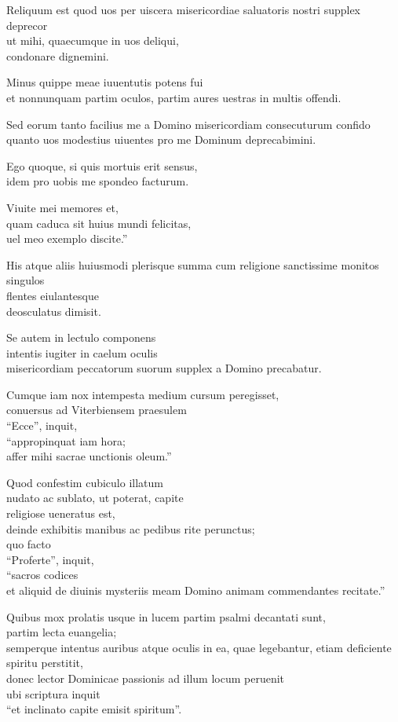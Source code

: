 \documentclass[a5paper,twoside]{article}
\begin{document}
Reliquum est quod uos per uiscera misericordiae saluatoris nostri supplex deprecor \\
ut mihi, quaecumque in uos deliqui, \\
condonare dignemini.  

Minus quippe meae iuuentutis potens fui \\
et nonnunquam partim oculos, partim aures uestras in multis offendi.   

Sed eorum tanto facilius me a Domino misericordiam consecuturum confido \\
quanto uos modestius uiuentes pro me Dominum deprecabimini.  

Ego quoque, si quis mortuis erit sensus, \\
idem pro uobis me spondeo facturum.  

Viuite mei memores et, \\
quam caduca sit huius mundi felicitas, \\
uel meo exemplo discite.''

His atque aliis huiusmodi plerisque summa cum religione sanctissime monitos singulos \\
flentes eiulantesque \\
deosculatus dimisit.  

Se autem in lectulo componens \\
intentis iugiter in caelum oculis \\
misericordiam peccatorum suorum supplex a Domino precabatur. 

Cumque iam nox intempesta medium cursum peregisset, \\
conuersus ad Viterbiensem praesulem \\
``Ecce'', inquit, \\
``appropinquat iam hora; \\
affer mihi sacrae unctionis oleum.''  

Quod confestim cubiculo illatum \\
nudato ac sublato, ut poterat, capite \\
religiose ueneratus est, \\
deinde exhibitis manibus ac pedibus rite perunctus; \\
quo facto \\
``Proferte'', inquit, \\
``sacros codices \\
et aliquid de diuinis mysteriis meam Domino animam commendantes recitate.''  

Quibus mox prolatis usque in lucem partim psalmi decantati sunt, \\
partim lecta euangelia; \\
semperque intentus auribus atque oculis in ea, quae legebantur, etiam deficiente spiritu perstitit, \\
donec lector Dominicae passionis ad illum locum peruenit \\
ubi scriptura inquit \\
``et inclinato capite emisit spiritum''.  
\end{document}
